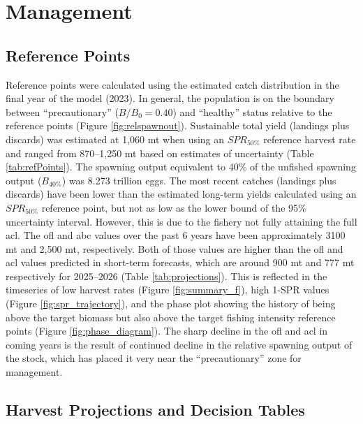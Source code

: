 \documentclass[11pt,
  english,
  letterpaper,
]{article}
\begin{document}
\hypertarget{management}{%
\section{Management}\label{management}}

\hypertarget{reference-points-1}{%
\subsection{Reference Points}\label{reference-points-1}}

Reference points were calculated using the estimated catch distribution in the final year of the model (2023). In general, the population is on the boundary between ``precautionary'' (\(B/B_0 = 0.40\)) and ``healthy'' status relative to the reference points (Figure \ref{fig:relspawnout}). Sustainable total yield (landings plus discards) was estimated at 1,060 mt when using an \(SPR_{50\%}\) reference harvest rate and ranged from 870--1,250 mt based on estimates of uncertainty (Table \ref{tab:refPoints}). The spawning output equivalent to 40\% of the unfished spawning output (\(B_{40\%}\)) was 8.273 trillion eggs. The most recent catches (landings plus discards) have been lower than the estimated long-term yields calculated using an \(SPR_{50\%}\) reference point, but not as low as the lower bound of the 95\% uncertainty interval. However, this is due to the fishery not fully attaining the full \gls{acl}. The \gls{ofl} and \gls{abc} values over the past 6 years have been approximately 3100 mt and 2,500 mt, respectively. Both of those values are higher than the \gls{ofl} and \gls{acl} values predicted in short-term forecasts, which are around 900 mt and 777 mt respectively for 2025--2026 (Table \ref{tab:projections}). This is reflected in the timeseries of low harvest rates (Figure \ref{fig:summary_f}), high 1-SPR values (Figure \ref{fig:spr_trajectory}), and the phase plot showing the history of being above the target biomass but also above the target fishing intensity reference points (Figure \ref{fig:phase_diagram}). The sharp decline in the \gls{ofl} and \gls{acl} in coming years is the result of continued decline in the relative spawning output of the stock, which has placed it very near the ``precautionary'' zone for management.

\hypertarget{harvest-projections-and-decision-tables}{%
\subsection{Harvest Projections and Decision Tables}\label{harvest-projections-and-decision-tables}}
\end{document}
